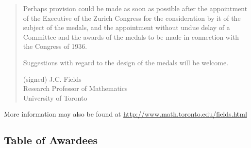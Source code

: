\begin{quote}
  Perhaps provision could be made as soon as possible after the
  appointment of the Executive of the Zurich Congress for the
  consideration by it of the subject of the medals, and the appointment
  without undue delay of a Committee and the awards of the medals to be
  made in connection with the Congress of 1936.

  Suggestions with regard to the design of the medals will be welcome.


                                 (signed)   J.C. Fields\\
                                            Research Professor of Mathematics\\
                                            University of Toronto
\end{quote}


More information may also be found at
%
%
\url{http://www.math.toronto.edu/fields.html}

\vfill\pagebreak

\subsection{Table of Awardees}

